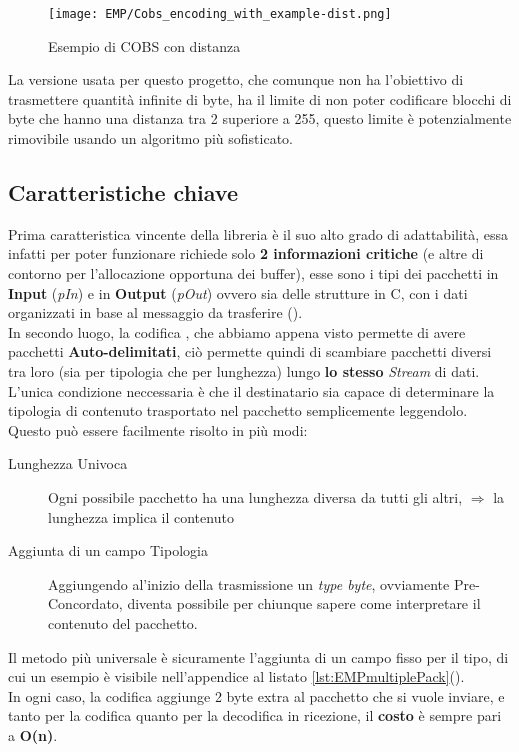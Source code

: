 \begin{figure}[h]
	\centering
	\caption[Esempio di COBS con distanza]{Esempio di COBS con distanza}
	\texttt{[image: EMP/Cobs\_encoding\_with\_example-dist.png]}
\end{figure}

La versione usata per questo progetto, che comunque non ha l'obiettivo di trasmettere quantità infinite di byte, ha il limite di non poter codificare blocchi di byte che hanno una distanza tra 2 \zeroByte superiore a 255, questo limite è potenzialmente rimovibile usando un algoritmo più sofisticato.

\subsection{Caratteristiche chiave}
Prima caratteristica vincente della libreria è il suo alto grado di adattabilità, essa infatti per poter funzionare richiede solo \textbf{2 informazioni critiche} (e altre di contorno per l'allocazione opportuna dei buffer), esse sono i tipi dei pacchetti in \textbf{ Input} (\textit{pIn}) e in \textbf{Output} (\textit{pOut}) ovvero sia delle strutture in C, con i dati organizzati in base al messaggio da trasferire ().\\
In secondo luogo, la codifica , che abbiamo appena visto permette di avere pacchetti \textbf{Auto-delimitati}, ciò permette quindi di scambiare pacchetti diversi tra loro (sia per tipologia che per lunghezza) lungo \textbf{lo stesso} \textit{Stream} di dati.\\
L'unica condizione neccessaria è che il destinatario sia capace di determinare la tipologia di contenuto trasportato nel pacchetto semplicemente leggendolo.\\
Questo può essere facilmente risolto in più modi:
\begin{spacing}{1.5}
	\begin{description}
		\item[Lunghezza Univoca] Ogni possibile pacchetto ha una lunghezza diversa da tutti gli altri, $\Rightarrow$ la lunghezza implica il contenuto
		\item[Aggiunta di un campo Tipologia] Aggiungendo al’inizio della trasmissione un \textit{type byte}, ovviamente Pre-Concordato, diventa possibile per chiunque sapere come interpretare il contenuto del pacchetto.
	\end{description}
\end{spacing}
\noindent
Il metodo più universale è sicuramente l'aggiunta di un campo fisso per il tipo, di cui un esempio è visibile nell'appendice al listato \ref{lst:EMPmultiplePack}().\\
In ogni caso, la codifica \cite*{COBS} aggiunge 2 byte extra al pacchetto che si vuole inviare, e tanto per la codifica quanto per la decodifica in ricezione, il \textbf{costo} è sempre pari a \textbf{O(n)}.


